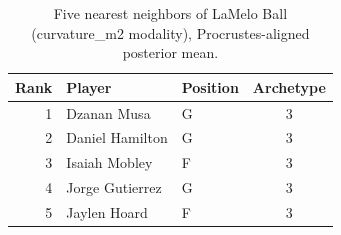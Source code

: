 \begin{table}[htbp]
  \centering\small
  \begin{tabular}{rllc}
    \toprule
    Rank & Player & Position & Archetype \\
    \midrule
    1 & Dzanan Musa & G & 3 \\
    2 & Daniel Hamilton & G & 3 \\
    3 & Isaiah Mobley & F & 3 \\
    4 & Jorge Gutierrez & G & 3 \\
    5 & Jaylen Hoard & F & 3 \\
    \bottomrule
  \end{tabular}
  \caption{Five nearest neighbors of LaMelo Ball (curvature_m2 modality), Procrustes-aligned posterior mean.}
  \label{tab:LaMelo_Ball_neighbors_curvature_m2}
\end{table}

